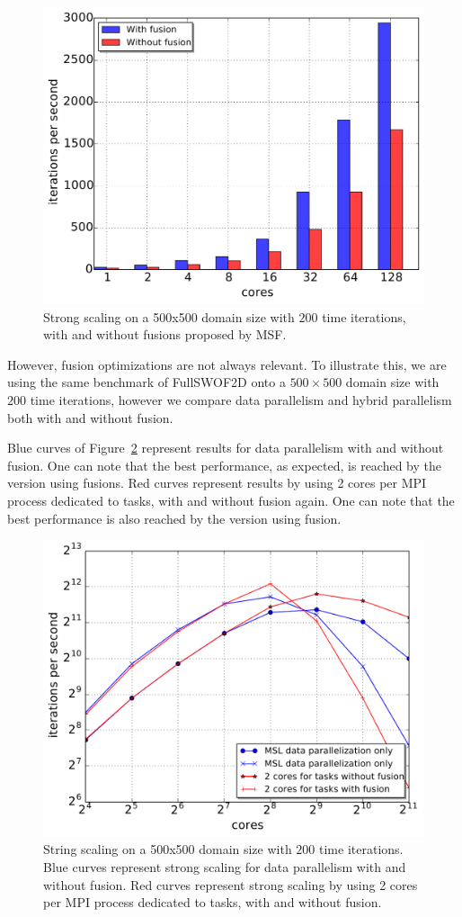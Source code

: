 \begin{figure}[!h]\begin{center}
  \includegraphics[width=.6\textwidth]{../results/task_scaling/500_200/fusVSbase.pdf}
  \caption{Strong scaling on a 500x500 domain size with $200$ time iterations, with and without fusions proposed by MSF.}
  \label{fig:fusion}
\end{center}\end{figure}

However, fusion optimizations are not always relevant. To illustrate this, we are using the same benchmark of FullSWOF2D onto a $500 \times 500$ domain size with $200$ time iterations, however we compare data parallelism and hybrid parallelism both with and without fusion. 

Blue curves of Figure~\ref{fig:fusion1} represent results for data parallelism with and without fusion. One can note that the best performance, as expected, is reached by the version using fusions. Red curves represent results by using 2 cores per MPI process dedicated to tasks, with and without fusion again. One can note that the best performance is also reached by the version using fusion.

\begin{figure}[!h]\begin{center}
  \includegraphics[width=.6\textwidth]{../results/task_scaling/500_200/withwithout2_close_median.pdf}
  \caption{String scaling on a 500x500 domain size with $200$ time iterations. Blue curves represent strong scaling for data parallelism with and without fusion. Red curves represent strong scaling by using 2 cores per MPI process dedicated to tasks, with and without fusion.}
  \label{fig:fusion1}
\end{center}\end{figure}

